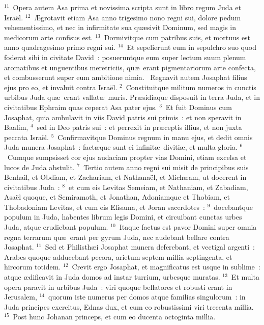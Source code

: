 ${}^{11}$~Opera autem Asa prima et novissima scripta sunt in libro regum Juda et Isra\"el.
${}^{12}$~\AE grotavit etiam Asa anno trigesimo nono regni sui, dolore pedum vehementissimo, et nec in infirmitate sua qu\ae sivit Dominum, sed magis in medicorum arte confisus est.
${}^{13}$~Dormivitque cum patribus suis, et mortuus est anno quadragesimo primo regni sui.
${}^{14}$~Et sepelierunt eum in sepulchro suo quod foderat sibi in civitate David~: posueruntque eum super lectum suum plenum aromatibus et unguentibus meretriciis, qu\ae\ erant pigmentariorum arte confecta, et combusserunt super eum ambitione nimia.
~Regnavit autem Josaphat filius ejus pro eo, et invaluit contra Isra\"el.
${}^{2}$~Constituitque militum numeros in cunctis urbibus Juda qu\ae\ erant vallat\ae\ muris. Pr\ae sidiaque disposuit in terra Juda, et in civitatibus Ephraim quas ceperat Asa pater ejus.
${}^{3}$~Et fuit Dominus cum Josaphat, quia ambulavit in viis David patris sui primis~: et non speravit in Baalim,
${}^{4}$~sed in Deo patris sui~: et perrexit in pr\ae ceptis illius, et non juxta peccata Isra\"el.
${}^{5}$~Confirmavitque Dominus regnum in manu ejus, et dedit omnis Juda munera Josaphat~: fact\ae que sunt ei infinit\ae\ diviti\ae , et multa gloria.
${}^{6}$~Cumque sumpsisset cor ejus audaciam propter vias Domini, etiam excelsa et lucos de Juda abstulit.
${}^{7}$~Tertio autem anno regni sui misit de principibus suis Benhail, et Obdiam, et Zachariam, et Nathana\"el, et Mich\ae am, ut docerent in civitatibus Juda~:
${}^{8}$~et cum eis Levitas Semeiam, et Nathaniam, et Zabadiam, Asa\"el quoque, et Semiramoth, et Jonathan, Adoniamque et Thobiam, et Thobadoniam Levitas, et cum eis Elisama, et Joran sacerdotes~:
${}^{9}$~docebantque populum in Juda, habentes librum legis Domini, et circuibant cunctas urbes Juda, atque erudiebant populum.
${}^{10}$~Itaque factus est pavor Domini super omnia regna terrarum qu\ae\ erant per gyrum Juda, nec audebant bellare contra Josaphat.
${}^{11}$~Sed et Philisth\ae i Josaphat munera deferebant, et vectigal argenti~: Arabes quoque adducebant pecora, arietum septem millia septingenta, et hircorum totidem.
${}^{12}$~Crevit ergo Josaphat, et magnificatus est usque in sublime~: atque \ae dificavit in Juda domos ad instar turrium, urbesque muratas.
${}^{13}$~Et multa opera paravit in urbibus Juda~: viri quoque bellatores et robusti erant in Jerusalem,
${}^{14}$~quorum iste numerus per domos atque familias singulorum~: in Juda principes exercitus, Ednas dux, et cum eo robustissimi viri trecenta millia.
${}^{15}$~Post hunc Johanan princeps, et cum eo ducenta octoginta millia.

